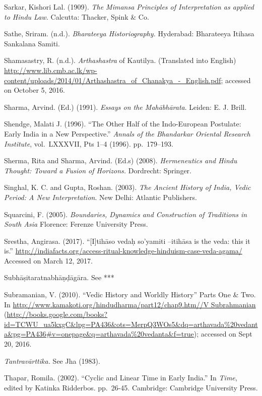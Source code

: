 \begin{thebibliography}{99}
  Sarkar, Kishori Lal. (1909). \textit{The Mimansa Principles of Interpretation as applied to Hindu Law.} Calcutta: Thacker, Spink \& Co. 

  Sathe, Sriram. (n.d.). \textit{Bharateeya Historiography.} Hyderabad: Bharateeya Itihasa Sankalana Samiti.

  Shamasastry, R. (n.d.). \textit{Arthashastra} of Kautilya. (Translated into English) \url{http://www.lib.cmb.ac.lk/wp-content/uploads/2014/01/Arthashastra_of_Chanakya_-_English.pdf}; accessed on October 5, 2016.

  Sharma, Arvind. (Ed.) (1991). \textit{Essays on the Mahābhārata}. Leiden: E. J. Brill.

  Shendge, Malati J. (1996). “The Other Half of the Indo-European Postulate: Early India in a New Perspective.” \textit{Annals of the Bhandarkar Oriental Research Institute}, vol.~LXXXVII, Pts 1--4 (1996). pp.~179--193.

  Sherma, Rita and Sharma, Arvind. (Ed.s) (2008). \textit{Hermeneutics and Hindu Thought: Toward a Fusion of Horizons.} Dordrecht: Springer.

  Singhal, K. C. and Gupta, Roshan. (2003). \textit{The Ancient History of India, Vedic Period: A New Interpretation}. New Delhi: Atlantic Publishers.

  Squarcini, F. (2005). \textit{Boundaries, Dynamics and Construction of Traditions in South Asia} Florence: Ferenze University Press.

  Srestha, Angirasa. (2017). “[I]tihāso vedaḥ so’yamiti –itihāsa is the veda: this it is.” \url{http://indiafacts.org/access-ritual-knowledge-hinduism-case-veda-agama/} Accessed on March 12, 2017.

  Subhāṣitaratnabhāṇḍāgāra. See ***

  Subramanian, V. (2010). “Vedic History and Worldly History” Parts One \& Two. In \url{http://www.kamakoti.org/hindudharma/part12/chap9.htm//V Subrahmanian} (\url{http://books.google.com/books?id=TCWU_ua5kxgC&lpg=PA436&ots=MerpQ3WOs5&dq=arthavada%20vedanta&pg=PA436#v=onepage&q=arthavada%20vedanta&f=true}); accessed on Sept 20, 2016.

  \textit{Tantravārttika.} See Jha (1983).

  Thapar, Romila. (2002). “Cyclic and Linear Time in Early India.” In \textit{Time}, edited by Katinka Ridderbos. pp.~26-45. Cambridge: Cambridge University Press.


\end{thebibliography}
